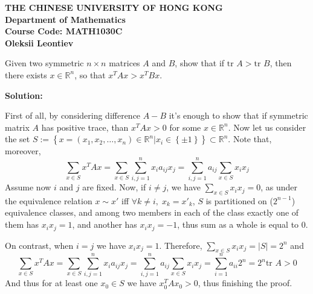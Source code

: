 \documentclass[12pt]{article}
\newcommand{\tr}{\mbox{tr }}
\newcommand{\myabs}[1]{\left|#1\right|}
\newcommand{\mysetn}[2]{\left\{#1\big| #2\right\}}
\newcommand{\mycbra}[1]{\left\{#1\right\}}
\begin{document}
\begin{center}
{\bf THE CHINESE UNIVERSITY OF HONG KONG}\\
{\bf Department of Mathematics}\\
{\bf Course Code: MATH1030C} \\
{\bf Oleksii Leontiev} \\
\end{center}

Given two symmetric $n\times n$ matrices $A$ and $B$, show that if $\tr A>\tr B$, then there exists $x\in\mathbb{R}^n$, so that
$x^T A x> x^T B x$.

\textbf{Solution:}

First of all, by considering difference $A-B$ it's enough to show that if symmetric matrix $A$ has positive trace, than $x^T A x>0$ for
some $x\in\mathbb{R}^n$. Now let us consider the set $S:=\mysetn{x=(x_1,x_2,\hdots,x_n)\in\mathbb{R}^n}{x_i\in\mycbra{\pm1}}\subset\mathbb{R}^n$. 
Note that, moreover,
\[\sum_{x\in S}x^TAx=\sum_{x\in S}\sum_{i,j=1}^n x_i a_{ij}x_j=\sum_{i,j=1}^na_{ij}\sum_{x\in S}x_ix_j\]
Assume now $i$ and $j$ are fixed.
Now, if $i\neq j$, we have $\sum_{x\in S}x_ix_j=0$, as under the equivalence relation
$x\sim x'$ iff $\forall k\neq i,\;x_k=x'_k$, $S$ is partitioned on ($2^{n-1}$) equivalence classes,
and among two members in each of the class exactly one of them has $x_ix_j=1$, and another has $x_ix_j=-1$, thus sum as a whole is equal to 0.

On contrast, when $i=j$ we have $x_ix_j=1$. Therefore, $\sum_{x\in S}x_ix_j=\myabs{S}=2^n$ and
\[\sum_{x\in S}x^TAx=\sum_{x\in S}\sum_{i,j=1}^n x_i a_{ij}x_j=\sum_{i,j=1}^na_{ij}\sum_{x\in S}x_ix_j=\sum_{i=1}^na_{ii}2^n=2^n\tr A>0\]
And thus for at least one $x_0\in S$ we have $x_0^TAx_0>0$, thus finishing the proof.
\end{document}
